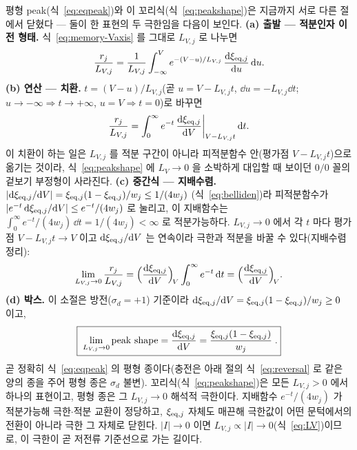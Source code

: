 평형 peak(식~\eqref{eq:eqpeak})와 이 꼬리식(식~\eqref{eq:peakshape})은 지금까지 서로 다른 절에서
닫혔다 --- 둘이 한 표현의 두 극한임을 다음이 보인다. \textbf{(a) 출발 --- 적분인자 이전 형태.}
식~\eqref{eq:memory-Vaxis} 를 그대로 $L_{V,j}$ 로 나누면
\begin{equation}
\frac{r_j}{L_{V,j}}=\frac{1}{L_{V,j}}\int_{-\infty}^{V} e^{-(V-u)/L_{V,j}}\,\frac{\mathrm{d}\xi_{\mathrm{eq},j}}{\mathrm{d} u}\,\mathrm{d} u.
\label{eq:tail-limit-start}
\end{equation}
\textbf{(b) 연산 --- 치환.} $t=(V-u)/L_{V,j}$(곧 $u=V-L_{V,j}t$, $\dd u=-L_{V,j}\dd t$; $u\to-\infty
\Rightarrow t\to+\infty$, $u=V\Rightarrow t=0$)로 바꾸면
\begin{equation}
\frac{r_j}{L_{V,j}}=\int_0^{\infty} e^{-t}\,\frac{\mathrm{d}\xi_{\mathrm{eq},j}}{\mathrm{d} V}\bigg|_{V-L_{V,j}t}\,\mathrm{d} t.
\label{eq:tail-limit-sub}
\end{equation}
이 치환이 하는 일은 $L_{V,j}$ 를 적분 구간이 아니라 피적분함수 안(평가점 $V-L_{V,j}t$)으로 옮기는 것이라,
식~\eqref{eq:peakshape} 에 $L_V\to0$ 을 소박하게 대입할 때 보이던 $0/0$ 꼴의 겉보기 부정형이 사라진다.
\textbf{(c) 중간식 --- 지배수렴.} $|\mathrm{d}\xi_{\mathrm{eq},j}/\mathrm{d} V|=\xi_{\mathrm{eq},j}(1-\xi_{\mathrm{eq},j})/w_j\le1/(4w_j)$
(식~\eqref{eq:belliden})라 피적분함수가 $|e^{-t}\,\mathrm{d}\xi_{\mathrm{eq},j}/\mathrm{d} V|\le e^{-t}/(4w_j)$ 로 눌리고, 이 지배함수는
$\int_0^\infty e^{-t}/(4w_j)\,\dd t=1/(4w_j)<\infty$ 로 적분가능하다. $L_{V,j}\to0$ 에서 각 $t$ 마다 평가점
$V-L_{V,j}t\to V$ 이고 $\mathrm{d}\xi_{\mathrm{eq},j}/\mathrm{d} V$ 는 연속이라 극한과 적분을 바꿀 수 있다(지배수렴정리):
\begin{equation}
\lim_{L_{V,j}\to0}\frac{r_j}{L_{V,j}}
=\Big(\frac{\mathrm{d}\xi_{\mathrm{eq},j}}{\mathrm{d} V}\Big)_{\!V}\int_0^\infty e^{-t}\,\mathrm{d} t
=\Big(\frac{\mathrm{d}\xi_{\mathrm{eq},j}}{\mathrm{d} V}\Big)_{\!V}.
\label{eq:tail-limit-mid}
\end{equation}
\textbf{(d) 박스.} 이 소절은 방전($\sigma_d{=}+1$) 기준이라 $\mathrm{d}\xi_{\mathrm{eq},j}/\mathrm{d} V=\xi_{\mathrm{eq},j}(1-\xi_{\mathrm{eq},j})/w_j\ge0$ 이고,
\begin{equation}
\boxed{\;\lim_{L_{V,j}\to0}\text{peak shape}
=\frac{\mathrm{d}\xi_{\mathrm{eq},j}}{\mathrm{d} V}
=\frac{\xi_{\mathrm{eq},j}(1-\xi_{\mathrm{eq},j})}{w_j}\;.}
\label{eq:tail-limit}
\end{equation}
곧 정확히 식~\eqref{eq:eqpeak} 의 평형 종이다(충전은 아래 절의 식~\eqref{eq:reversal} 로 같은 양의 종을 주어 평형 종은
$\sigma_d$ 불변). 꼬리식(식~\eqref{eq:peakshape})은 모든 $L_{V,j}>0$ 에서 하나의 표현이고, 평형 종은 그 $L_{V,j}\to0$
해석적 극한이다. 지배함수 $e^{-t}/(4w_j)$ 가 적분가능해 극한$\cdot$적분 교환이 정당하고, $\xi_{\mathrm{eq},j}$ 자체도 매끈해
극한값이 어떤 문턱에서의 전환이 아니라 극한 그 자체로 닫힌다. $|I|\to0$ 이면 $L_{V,j}\propto|I|\to0$(식~\eqref{eq:LV})이므로,
이 극한이 곧 저전류 기준선으로 가는 길이다.

